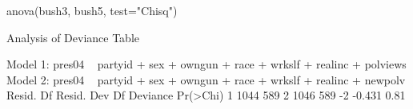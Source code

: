 \begin{Schunk}
\begin{Sinput}
 anova(bush3, bush5, test="Chisq")
\end{Sinput}
\begin{Soutput}
Analysis of Deviance Table

Model 1: pres04 ~ partyid + sex + owngun + race + wrkslf + realinc + polviews
Model 2: pres04 ~ partyid + sex + owngun + race + wrkslf + realinc + newpolv
  Resid. Df Resid. Dev Df Deviance Pr(>Chi)
1      1044        589                     
2      1046        589 -2   -0.431     0.81
\end{Soutput}
\end{Schunk}
